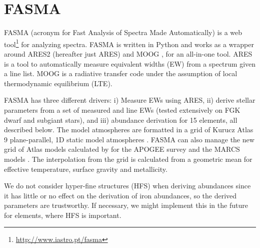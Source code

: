 \documentclass{aa}
\begin{document}
\section{FASMA}
\label{sec:FASMA}
FASMA (acronym for Fast Analysis of Spectra Made Automatically) is a web
tool\footnote{\url{http://www.iastro.pt/fasma}} for analyzing spectra. FASMA is
written in Python and works as a wrapper around ARES2 \citep{Sousa2015a}
(hereafter just ARES) and MOOG \citep[][version 2014]{Sneden1973}, for an
all-in-one tool. ARES is a tool to automatically measure equivalent widths (EW)
from a spectrum given a line list. MOOG is a radiative transfer code under the
assumption of local thermodynamic equilibrium (LTE).

FASMA has three different drivers: i) Measure EWs using ARES, ii) derive stellar
parameters from a set of measured  and  line EWs (tested
extensively on FGK dwarf and subgiant stars), and iii) abundance derivation for
15 elements, all described below. The model atmospheres are formatted in a grid
of Kurucz Atlas 9 plane-parallel, 1D static model atmospheres
\citet{Kurucz1993}. FASMA can also manage the new grid of Atlas models
calculated by \citet{Meszaros2012} for the APOGEE survey and the MARCS models
\citep{Gustafson2008}. The interpolation from the grid is calculated from a
geometric mean for effective temperature, surface gravity and metallicity.

We do not consider hyper-fine structures (HFS) when deriving abundances since it
has little or no effect on the derivation of iron abundances, so the derived
parameters are trustworthy. If necessary, we might implement this in the future
for elements, where HFS is important.
\end{document}
